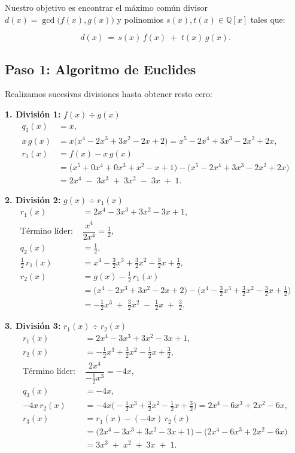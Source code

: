 \documentclass[12pt]{article}
\begin{document}
Nuestro objetivo es encontrar el máximo común divisor
\(d(x) = \gcd\bigl(f(x), g(x)\bigr)\) y polinomios
\(s(x), t(x) \in \mathbb{Q}[x]\) tales que:

\[
  d(x) \,=\, s(x)\,f(x) \;+\; t(x)\,g(x).
\]

\subsection*{Paso 1: Algoritmo de Euclides}

Realizamos sucesivas divisiones hasta obtener resto cero:

\noindent\textbf{1. División 1:} \(f(x) \div g(x)\)
\begin{align*}
  q_1(x) &= x, \\[6pt]
  x\,g(x) &= x\bigl(x^4 - 2x^3 + 3x^2 - 2x + 2\bigr)
            = x^5 - 2x^4 + 3x^3 - 2x^2 + 2x, \\[6pt]
  r_1(x) &= f(x) - x\,g(x) \\[3pt]
          &= \bigl(x^5 + 0x^4 + 0x^3 + x^2 - x + 1\bigr)
             - \bigl(x^5 - 2x^4 + 3x^3 - 2x^2 + 2x\bigr) \\[3pt]
          &= 2x^4 \;-\; 3x^3 \;+\; 3x^2 \;-\; 3x \;+\; 1.
\end{align*}

\noindent\textbf{2. División 2:} \(g(x) \div r_1(x)\)
\begin{align*}
  r_1(x) &= 2x^4 - 3x^3 + 3x^2 - 3x + 1, \\[6pt]
  \text{Término líder: }&\dfrac{x^4}{2x^4} = \tfrac12, \\[6pt]
  q_2(x) &= \tfrac12, \\[6pt]
  \tfrac12\,r_1(x) &= x^4 - \tfrac32 x^3 + \tfrac32 x^2 - \tfrac32 x + \tfrac12, \\[6pt]
  r_2(x) &= g(x) - \tfrac12\,r_1(x) \\[3pt]
         &= \bigl(x^4 - 2x^3 + 3x^2 - 2x + 2\bigr)
            - \bigl(x^4 - \tfrac32 x^3 + \tfrac32 x^2 - \tfrac32 x + \tfrac12\bigr) \\[3pt]
         &= -\tfrac12 x^3 \;+\; \tfrac32 x^2 \;-\; \tfrac12 x \;+\; \tfrac32.
\end{align*}

\noindent\textbf{3. División 3:} \(r_1(x) \div r_2(x)\)
\begin{align*}
  r_1(x) &= 2x^4 - 3x^3 + 3x^2 - 3x + 1, \\
  r_2(x) &= -\tfrac12 x^3 + \tfrac32 x^2 - \tfrac12 x + \tfrac32, \\[6pt]
  \text{Término líder: }&\dfrac{2x^4}{-\tfrac12 x^3} = -4x, \\[6pt]
  q_3(x) &= -4x, \\[6pt]
  -4x\,r_2(x) &= -4x\bigl(-\tfrac12 x^3 + \tfrac32 x^2 - \tfrac12 x + \tfrac32\bigr)
              = 2x^4 - 6x^3 + 2x^2 - 6x, \\[6pt]
  r_3(x) &= r_1(x) - (-4x)\,r_2(x) \\[3pt]
         &= \bigl(2x^4 - 3x^3 + 3x^2 - 3x + 1\bigr)
            - \bigl(2x^4 - 6x^3 + 2x^2 - 6x\bigr) \\[3pt]
         &= 3x^3 \;+\; x^2 \;+\; 3x \;+\; 1.
\end{align*}
\end{document}
